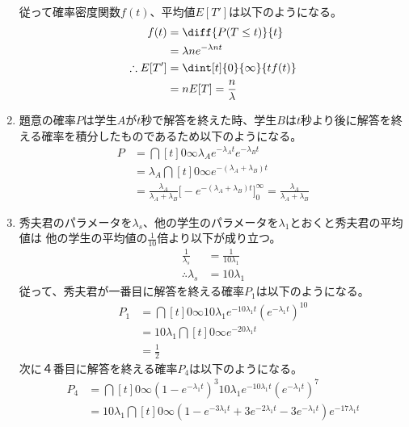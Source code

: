 \begin{enumerate}[(1)]
\begin{align*}
        \end{align*}
        従って確率密度関数$f(t)$、平均値$E[T']$は以下のようになる。
        \begin{align*}
            f(t) &= \diff{P(T \leq t)}{t}\\
            &= \lambda n e^{- \lambda n t}\\
            \therefore E[T'] &= \dint[t]{0}{\infty}{tf(t)}\\
            &= n E[T] = \frac{n}{\lambda}\\
        \end{align*}
    \item 題意の確率$P$は学生$A$が$t$秒で解答を終えた時、学生$B$は$t$秒より後に解答を終える確率を積分したものであるため以下のようになる。
        \begin{align*}
            P &= \dint[t]{0}{\infty}{\lambda_Ae^{-\lambda_A t}e^{-\lambda_B t}}\\
            &= \lambda_A \dint[t]{0}{\infty}{e^{-(\lambda_A + \lambda_B)t}}\\
            &= \frac{\lambda_A}{\lambda_A + \lambda_B} \bigl[-e^{-(\lambda_A + \lambda_B)t}\bigr]_{0}^{\infty} 
            = \frac{\lambda_A}{\lambda_A + \lambda_B} 
        \end{align*}
    \item 秀夫君のパラメータを$\lambda_s$、他の学生のパラメータを$\lambda_1$とおくと秀夫君の平均値は
    他の学生の平均値の$\frac{1}{10}$倍より以下が成り立つ。
        \begin{align*}
            \frac{1}{\lambda_s} &= \frac{1}{10\lambda_1}\\
            \therefore \lambda_s &= 10\lambda_1
        \end{align*}
        従って、秀夫君が一番目に解答を終える確率$P_1$は以下のようになる。
        \begin{align*}
            P_1 &= \dint[t]{0}{\infty}{10\lambda_1 e^{-10\lambda_1 t}\left(e^{-\lambda_1 t}\right)^{10}}\\
            &= 10\lambda_1 \dint[t]{0}{\infty}{e^{-20\lambda_1 t}}\\
            &= \frac{1}{2}
        \end{align*}
        次に４番目に解答を終える確率$P_4$は以下のようになる。
        \begin{align*}
            P_4 &= \dint[t]{0}{\infty}{\left(1 - e^{-\lambda_1 t}\right)^{3}10\lambda_1 e^{-10\lambda_1 t}\left(e^{-\lambda_1 t}\right)^{7}}\\
            &= 10\lambda_1 \dint[t]{0}{\infty}{\left(1 - e^{-3\lambda_1 t} + 3e^{-2\lambda_1 t} - 3e^{-\lambda_1 t}\right)e^{-17\lambda_1 t}}\\

\end{align*}
\end{enumerate}
